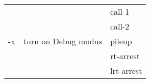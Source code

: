 {\small
\begin{tabular}{@{}p{}p{}l@{}}
\multirow{5}{=}{-x} & \multirow{5}{=}{turn on Debug modus} & call-1 \\
 &  & call-2 \\
 &  & pileup \\
 &  & rt-arrest \\
 &  & lrt-arrest \\
\end{tabular}\\
}
